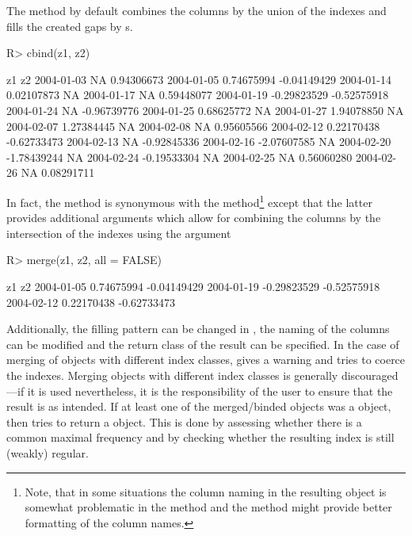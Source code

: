 \documentclass{Z}
\begin{document}
The  method by default combines the columns by the union of
the indexes and fills the created gaps by s.
\begin{Schunk}
\begin{Sinput}
R> cbind(z1, z2)
\end{Sinput}
\begin{Soutput}
           z1          z2         
2004-01-03          NA  0.94306673
2004-01-05  0.74675994 -0.04149429
2004-01-14  0.02107873          NA
2004-01-17          NA  0.59448077
2004-01-19 -0.29823529 -0.52575918
2004-01-24          NA -0.96739776
2004-01-25  0.68625772          NA
2004-01-27  1.94078850          NA
2004-02-07  1.27384445          NA
2004-02-08          NA  0.95605566
2004-02-12  0.22170438 -0.62733473
2004-02-13          NA -0.92845336
2004-02-16 -2.07607585          NA
2004-02-20 -1.78439244          NA
2004-02-24 -0.19533304          NA
2004-02-25          NA  0.56060280
2004-02-26          NA  0.08291711
\end{Soutput}
\end{Schunk}
In fact, the  method is synonymous with the 
method\footnote{Note, that in some situations the column naming in the
resulting object is somewhat problematic in the  method
and the  method might provide better formatting of the
column names.}
except that the latter provides additional arguments
which allow for combining the columns by the intersection
of the indexes using the argument 
\begin{Schunk}
\begin{Sinput}
R> merge(z1, z2, all = FALSE)
\end{Sinput}
\begin{Soutput}
           z1          z2         
2004-01-05  0.74675994 -0.04149429
2004-01-19 -0.29823529 -0.52575918
2004-02-12  0.22170438 -0.62733473
\end{Soutput}
\end{Schunk}
Additionally, the filling pattern can be changed in ,
the naming of the
columns can be modified and the return class of the result can
be specified. In the case of merging of objects with 
different index classes,  gives a warning and tries to
coerce the indexes. Merging objects with different index classes is
generally discouraged---if it is used nevertheless, it is the
responsibility of the user to ensure that the result is as intended.
If at least one of the merged/binded objects was a  
object, then  tries to return a 
object. This is done by assessing whether there is a common maximal 
frequency and by checking whether the resulting index is still
(weakly) regular.
\end{document}
